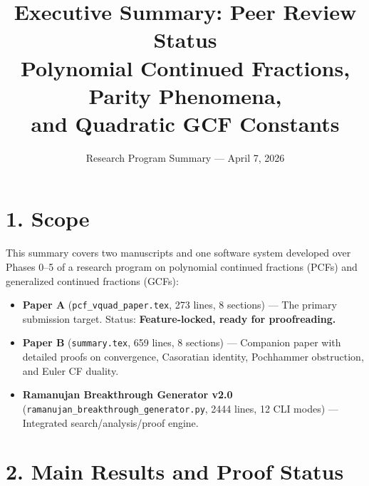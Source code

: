 \documentclass[11pt]{article}
\title{Executive Summary: Peer Review Status\\[4pt]
\large Polynomial Continued Fractions, Parity Phenomena,\\
and Quadratic GCF Constants}
\author{Research Program Summary — April 7, 2026}
\date{}
\begin{document}
\maketitle

\section*{1. Scope}

This summary covers two manuscripts and one software system developed over
Phases 0--5 of a research program on polynomial continued fractions (PCFs)
and generalized continued fractions (GCFs):

\begin{itemize}[leftmargin=1.5em]
\item \textbf{Paper A} (\texttt{pcf\_vquad\_paper.tex}, 273 lines, 8 sections) ---
  The primary submission target.  Status: \textbf{Feature-locked, ready for proofreading.}
\item \textbf{Paper B} (\texttt{summary.tex}, 659 lines, 8 sections) ---
  Companion paper with detailed proofs on convergence, Casoratian identity,
  Pochhammer obstruction, and Euler CF duality.
\item \textbf{Ramanujan Breakthrough Generator v2.0}
  (\texttt{ramanujan\_breakthrough\_generator.py}, 2444 lines, 12 CLI modes) ---
  Integrated search/analysis/proof engine.
\end{itemize}

\section*{2. Main Results and Proof Status}
\end{document}
